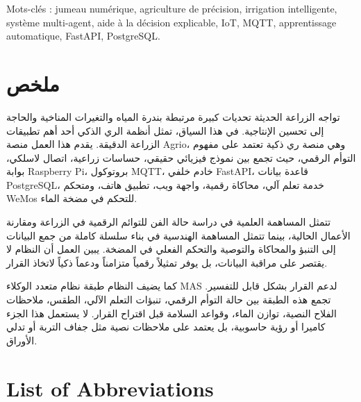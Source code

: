 Mots-clés : jumeau numérique, agriculture de précision, irrigation intelligente, système multi-agent, aide à la décision explicable, IoT, MQTT, apprentissage automatique, FastAPI, PostgreSQL.

\chapter*{\texorpdfstring{\textarabic{ملخص}}{Arabic summary}}

\begin{Arabic}
تواجه الزراعة الحديثة تحديات كبيرة مرتبطة بندرة المياه والتغيرات المناخية والحاجة إلى تحسين الإنتاجية. في هذا السياق، تمثل أنظمة الري الذكي أحد أهم تطبيقات الزراعة الدقيقة. يقدم هذا العمل منصة Agrio، وهي منصة ري ذكية تعتمد على مفهوم التوأم الرقمي، حيث تجمع بين نموذج فيزيائي حقيقي، حساسات زراعية، اتصال لاسلكي، بوابة Raspberry Pi، بروتوكول MQTT، خادم خلفي FastAPI، قاعدة بيانات PostgreSQL، خدمة تعلم آلي، محاكاة رقمية، واجهة ويب، تطبيق هاتف، ومتحكم WeMos للتحكم في مضخة الماء.
\end{Arabic}

\begin{Arabic}
تتمثل المساهمة العلمية في دراسة حالة الفن للتوائم الرقمية في الزراعة ومقارنة الأعمال الحالية، بينما تتمثل المساهمة الهندسية في بناء سلسلة كاملة من جمع البيانات إلى التنبؤ والمحاكاة والتوصية والتحكم الفعلي في المضخة. يبين العمل أن النظام لا يقتصر على مراقبة البيانات، بل يوفر تمثيلاً رقمياً متزامناً ودعماً ذكياً لاتخاذ القرار.
\end{Arabic}

\begin{Arabic}
كما يضيف النظام طبقة نظام متعدد الوكلاء \textenglish{MAS} لدعم القرار بشكل قابل للتفسير. تجمع هذه الطبقة بين حالة التوأم الرقمي، تنبؤات التعلم الآلي، الطقس، ملاحظات الفلاح النصية، توازن الماء، وقواعد السلامة قبل اقتراح القرار. لا يستعمل هذا الجزء كاميرا أو رؤية حاسوبية، بل يعتمد على ملاحظات نصية مثل جفاف التربة أو تدلي الأوراق.
\end{Arabic}

\chapter*{List of Abbreviations}

